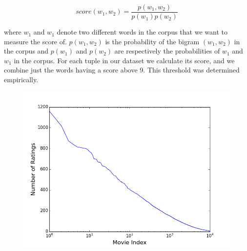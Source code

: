 \documentclass{article}
\begin{document}
$$score(w_{1},w_{2})= \frac{p(w_{1},w_{2})}{p(w_{1})p(w_{2})}$$

 where $w_{1}$ and $w_{1}$ denote two different words in the corpus that we want to measure the score of.  $p(w_{1},w_{2})$ is the probability of the bigram $(w_{1},w_{2})$ in the corpus and $p(w_{1})$ and $p(w_{2})$ are respectively the probabilities of $w_{1}$ and $w_{1}$ in the corpus.
For each tuple in our dataset we calculate its score, and we combine just the words having a score above 9. This threshold was determined empirically.

\begin{figure}
\centering
\begin{minipage}{.6\textwidth}
  
  \includegraphics[width=\linewidth]{NbRatingsPerMovie.png}
  
	 \label{NbRatingsPerMovie}
\end{minipage}%
\centering
\begin{minipage}{.6\textwidth}
  

\end{minipage}
\end{figure}
\end{document}
